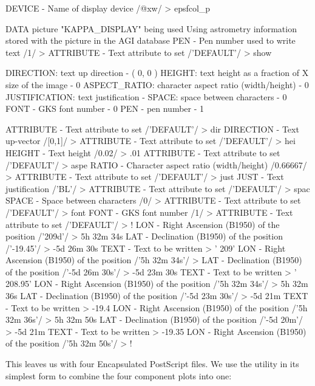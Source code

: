 \documentclass[11pt,noabs]{starlink}
\begin{document}
\begin{terminalv}
DEVICE - Name of display device /@xw/ > epsfcol_p

 DATA picture "KAPPA_DISPLAY" being used
 Using astrometry information stored with the picture in the
 AGI database
PEN - Pen number used to write text /1/ >
ATTRIBUTE - Text attribute to set /'DEFAULT'/ > show

 DIRECTION: text up direction - ( 0, 0 )
 HEIGHT: text height as a fraction of X size of the image - 0
 ASPECT_RATIO: character aspect ratio (width/height) - 0
 JUSTIFICATION: text justification -
 SPACE: space between characters - 0
 FONT - GKS font number - 0
 PEN - pen number - 1

ATTRIBUTE - Text attribute to set /'DEFAULT'/ > dir
DIRECTION - Text up-vector /[0,1]/ >
ATTRIBUTE - Text attribute to set /'DEFAULT'/ > hei
HEIGHT - Text height /0.02/ > .01
ATTRIBUTE - Text attribute to set /'DEFAULT'/ > aspe
RATIO - Character aspect ratio (width/height) /0.66667/ >
ATTRIBUTE - Text attribute to set /'DEFAULT'/ > just
JUST - Text justification /'BL'/ >
ATTRIBUTE - Text attribute to set /'DEFAULT'/ > spac
SPACE - Space between characters /0/ >
ATTRIBUTE - Text attribute to set /'DEFAULT'/ > font
FONT - GKS font number /1/ >
ATTRIBUTE - Text attribute to set /'DEFAULT'/ > !
LON - Right Ascension (B1950) of the position /'209d'/ > 5h 32m 34s
LAT - Declination (B1950) of the position /'-19.45'/ > -5d 26m 30s
TEXT - Text to be written > '  209'
LON - Right Ascension (B1950) of the position /'5h 32m 34s'/ >
LAT - Declination (B1950) of the position /'-5d 26m 30s'/ > -5d 23m 30s
TEXT - Text to be written > '  208.95'
LON - Right Ascension (B1950) of the position /'5h 32m 34s'/ > 5h 32m 36s
LAT - Declination (B1950) of the position /'-5d 23m 30s'/ > -5d 21m
TEXT - Text to be written > -19.4
LON - Right Ascension (B1950) of the position /'5h 32m 36s'/ > 5h 32m 50s
LAT - Declination (B1950) of the position /'-5d 20m'/ > -5d 21m
TEXT - Text to be written > -19.35
LON - Right Ascension (B1950) of the position /'5h 32m 50s'/ > !
\end{terminalv}

   This leaves us with four Encapsulated PostScript files. We use the
\texttt{}
   utility in its simplest form to combine the four
   component plots into one:

\begin{terminalv}
\end{terminalv}
\end{document}
